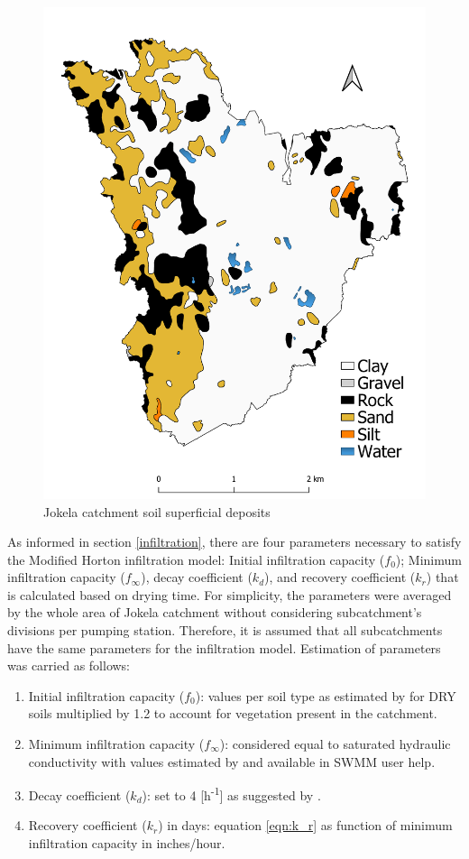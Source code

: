\begin{figure}[h]
    \centering
	\includegraphics[scale=0.4]{figures/Jokela_Superficial_Deposits.pdf}
	\caption{Jokela catchment soil superficial deposits}
	\label{fig:supdeposits}
\end{figure}

As informed in section \ref{infiltration}, there are four parameters necessary to satisfy the Modified Horton infiltration model: Initial infiltration capacity ($f_0$); Minimum infiltration capacity ($f_\infty$), decay coefficient ($k_d$), and recovery coefficient ($k_r$) that is calculated based on drying time. For simplicity, the parameters were averaged by the whole area of Jokela catchment without considering subcatchment's divisions per pumping station. Therefore, it is assumed that all subcatchments have the same parameters for the infiltration model. Estimation of parameters was carried as follows:
\begin{enumerate}
    \item Initial infiltration capacity ($f_0$): values per soil type as estimated by \citet{Rossman2016} for DRY soils multiplied by 1.2 to account for vegetation present in the catchment.
    \item Minimum infiltration capacity ($f_\infty$): considered equal to saturated hydraulic conductivity with values estimated by \citet{Rawls1983} and available in SWMM user help.
    \item Decay coefficient ($k_d$): set to 4 [h\textsuperscript{-1}] as suggested by \citet{Rossman2016}.
    \item Recovery coefficient ($k_r$) in days: equation \ref{eqn:k_r} as function of minimum infiltration capacity in inches/hour.
\end{enumerate}

